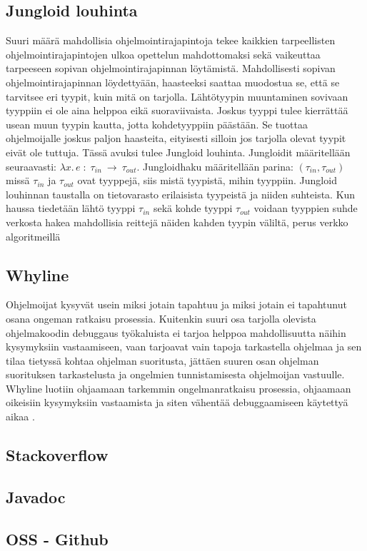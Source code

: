 \documentclass[finnish]{../tktltiki2}
\theoremstyle{definition}
\theoremstyle{remark}
\begin{document}
\subsection{Jungloid louhinta}
Suuri määrä mahdollisia ohjelmointirajapintoja tekee kaikkien tarpeellisten ohjelmointirajapintojen ulkoa opettelun mahdottomaksi sekä vaikeuttaa tarpeeseen sopivan ohjelmointirajapinnan löytämistä. Mahdollisesti sopivan ohjelmointirajapinnan löydettyään, haasteeksi saattaa muodostua se, että se tarvitsee eri tyypit, kuin mitä on tarjolla. Lähtötyypin muuntaminen sovivaan tyyppiin ei ole aina helppoa eikä suoraviivaista. Joskus tyyppi tulee kierrättää usean muun tyypin kautta, jotta kohdetyyppiin päästään. Se tuottaa ohjelmoijalle joskus paljon haasteita, eityisesti silloin jos tarjolla olevat tyypit eivät ole tuttuja. Tässä avuksi tulee Jungloid louhinta.
Jungloidit määritellään seuraavasti: $ \lambda x.\, e\; :\; \tau_{in}\:\to\:\tau_{out}$. Jungloidhaku määritellään parina: $(\tau_{in}, \tau_{out})$ missä $\tau_{in}$ ja $\tau_{out}$ ovat tyyppejä, siis mistä tyypistä, mihin tyyppiin. Jungloid louhinnan taustalla on tietovarasto erilaisista tyypeistä ja niiden suhteista. Kun haussa tiedetään lähtö tyyppi $\tau_{in}$ sekä kohde tyyppi $\tau_{out}$ voidaan tyyppien suhde verkosta hakea mahdollisia reittejä näiden kahden tyypin väliltä, perus verkko algoritmeillä \cite{jungloid-mining}
\subsection{Whyline}
Ohjelmoijat kysyvät usein miksi jotain tapahtuu ja miksi jotain ei tapahtunut osana ongeman ratkaisu prosessia. Kuitenkin suuri osa tarjolla olevista ohjelmakoodin debuggaus työkaluista ei tarjoa helppoa mahdollisuutta näihin kysymyksiin vastaamiseen, vaan tarjoavat vain tapoja tarkastella ohjelmaa ja sen tilaa tietyssä kohtaa ohjelman suoritusta, jättäen suuren osan ohjelman suorituksen tarkastelusta ja ongelmien tunnistamisesta ohjelmoijan vastuulle. Whyline luotiin ohjaamaan tarkemmin ongelmanratkaisu prosessia, ohjaamaan oikeisiin kysymyksiin vastaamista ja siten vähentää debuggaamiseen käytettyä aikaa \cite{whyline}.
\subsection{Stackoverflow}
\subsection{Javadoc}
\subsection{OSS - Github}
\end{document}
